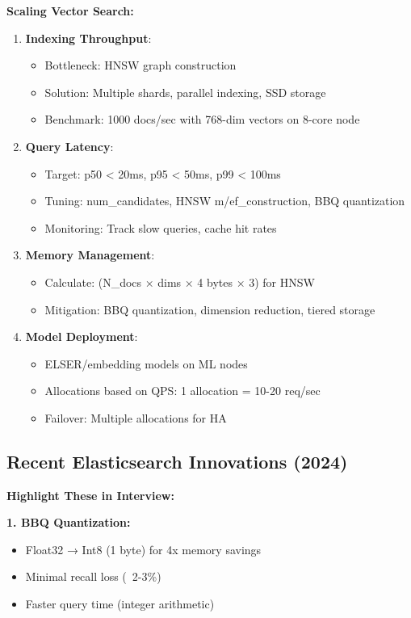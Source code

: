 \documentclass[10pt]{article}
\begin{document}
\textbf{Scaling Vector Search:}
\begin{enumerate}
\item \textbf{Indexing Throughput}:
  \begin{itemize}
  \item Bottleneck: HNSW graph construction
  \item Solution: Multiple shards, parallel indexing, SSD storage
  \item Benchmark: 1000 docs/sec with 768-dim vectors on 8-core node
  \end{itemize}

\item \textbf{Query Latency}:
  \begin{itemize}
  \item Target: p50 < 20ms, p95 < 50ms, p99 < 100ms
  \item Tuning: num\_candidates, HNSW m/ef\_construction, BBQ quantization
  \item Monitoring: Track slow queries, cache hit rates
  \end{itemize}

\item \textbf{Memory Management}:
  \begin{itemize}
  \item Calculate: (N\_docs × dims × 4 bytes × 3) for HNSW
  \item Mitigation: BBQ quantization, dimension reduction, tiered storage
  \end{itemize}

\item \textbf{Model Deployment}:
  \begin{itemize}
  \item ELSER/embedding models on ML nodes
  \item Allocations based on QPS: 1 allocation = 10-20 req/sec
  \item Failover: Multiple allocations for HA
  \end{itemize}
\end{enumerate}

\subsection{Recent Elasticsearch Innovations (2024)}

\textbf{Highlight These in Interview:}

\textbf{1. BBQ Quantization:}
\begin{itemize}
\item Float32 → Int8 (1 byte) for 4x memory savings
\item Minimal recall loss (~2-3\%)
\item Faster query time (integer arithmetic)
\end{itemize}
\end{document}
